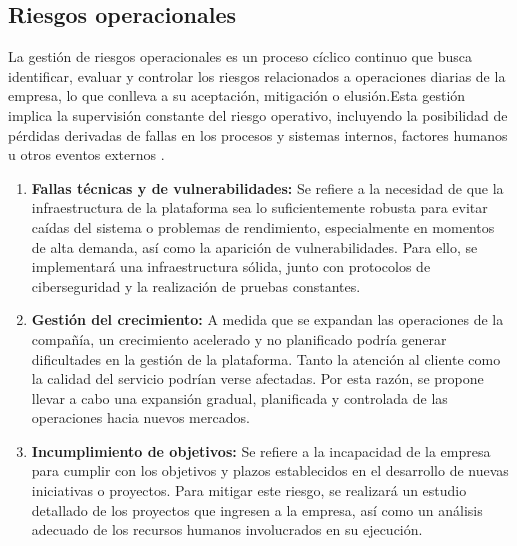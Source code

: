 {}
\subsection*{Riesgos operacionales}


La gestión de riesgos operacionales es un proceso cíclico continuo que busca identificar, evaluar y controlar los riesgos relacionados a operaciones diarias de la empresa, lo que conlleva a su aceptación, mitigación o elusión.Esta gestión implica la supervisión constante del riesgo operativo, incluyendo la posibilidad de pérdidas derivadas de fallas en los procesos y sistemas internos, factores humanos u otros eventos externos \parencite{Microbank01}.

\begin{enumerate}
	\item \textbf{Fallas técnicas y de vulnerabilidades:} Se refiere a la necesidad de que la infraestructura de la plataforma sea lo suficientemente robusta para evitar caídas del sistema o problemas de rendimiento, especialmente en momentos de alta demanda, así como la aparición de vulnerabilidades. Para ello, se implementará una infraestructura sólida, junto con protocolos de ciberseguridad y la realización de pruebas constantes.
	
	\item \textbf{Gestión del crecimiento:} A medida que se expandan las operaciones de la compañía, un crecimiento acelerado y no planificado podría generar dificultades en la gestión de la plataforma. Tanto la atención al cliente como la calidad del servicio podrían verse afectadas. Por esta razón, se propone llevar a cabo una expansión gradual, planificada y controlada de las operaciones hacia nuevos mercados.
	
	\item \textbf{Incumplimiento de objetivos:} Se refiere a la incapacidad de la empresa para cumplir con los objetivos y plazos establecidos en el desarrollo de nuevas iniciativas o proyectos. Para mitigar este riesgo, se realizará un estudio detallado de los proyectos que ingresen a la empresa, así como un análisis adecuado de los recursos humanos involucrados en su ejecución.
\end{enumerate}


